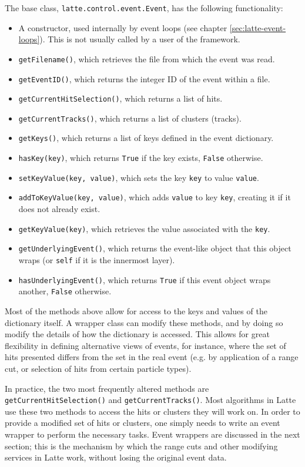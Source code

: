 The base class, \texttt{latte.control.event.Event}, has the following functionality:
\begin{itemize}
\item A constructor, used internally by event loops (see chapter \ref{sec:latte-event-loops}). This is not usually called by a user of the framework.
\item \texttt{getFilename()}, which retrieves the file from which the event was read.
\item \texttt{getEventID()}, which returns the integer ID of the event within a file.
\item \texttt{getCurrentHitSelection()}, which returns a list of hits.
\item \texttt{getCurrentTracks()}, which returns a list of clusters (tracks).
\item \texttt{getKeys()}, which returns a list of keys defined in the event dictionary.
\item \texttt{hasKey(key)}, which returns \texttt{True} if the key exists, \texttt{False} otherwise.
\item \texttt{setKeyValue(key, value)}, which sets the key \texttt{key} to value \texttt{value}.
\item \texttt{addToKeyValue(key, value)}, which adds \texttt{value} to key \texttt{key}, creating it if it does not already exist.
\item \texttt{getKeyValue(key)}, which retrieves the value associated with the \texttt{key}.
\item \texttt{getUnderlyingEvent()}, which returns the event-like object that this object wraps (or \texttt{self} if it is the innermost layer).
\item \texttt{hasUnderlyingEvent()}, which returns \texttt{True} if this event object wraps another, \texttt{False} otherwise.
\end{itemize}

Most of the methods above allow for access to the keys and values of the dictionary itself. A wrapper class can modify these methods, and by doing so modify the details of how the dictionary is accessed. This allows for great flexibility in defining alternative views of events, for instance, where the set of hits presented differs from the set in the real event (e.g. by application of a range cut, or selection of hits from certain particle types).

In practice, the two most frequently altered methods are \texttt{getCurrentHitSelection()} and \texttt{getCurrentTracks()}. Most algorithms in Latte use these two methods to access the hits or clusters they will work on. In order to provide a modified set of hits or clusters, one simply needs to write an event wrapper to perform the necessary tasks. Event wrappers are discussed in the next section; this is the mechanism by which the range cuts and other modifying services in Latte work, without losing the original event data.

